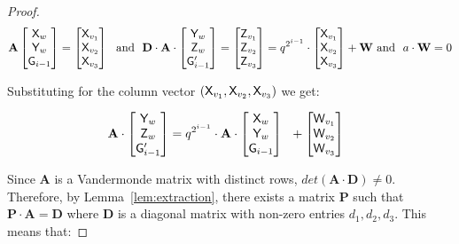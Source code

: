 \documentclass[12pt]{article}
\theoremstyle{Definition}
\begin{document}
\begin{proof}
$$\mathbf{A}
\begin{bmatrix}
\gr{X}_w \\ 
\gr{Y}_w \\ 
\gr{G}_{i-1}
\end{bmatrix} 
=  
\begin{bmatrix}
\gr{X}_{v_1} \\ 
\gr{X}_{v_2} \\ 
\gr{X}_{v_3}
\end{bmatrix}
\ \ \text{and} \ \ 
\mathbf{D} \cdot 
\mathbf{A} \cdot 
\begin{bmatrix}
\gr{Y}_w \\ 
\gr{Z}_w \\ 
\gr{G}'_{i-1}
\end{bmatrix} 
= 
\begin{bmatrix}
\gr{Z}_{v_1} \\ 
\gr{Z}_{v_2} \\ 
\gr{Z}_{v_3}
\end{bmatrix} 
= 
q^{2^{i-1}} \cdot 
\begin{bmatrix}
\gr{X}_{v_1} \\ 
\gr{X}_{v_2} \\ 
\gr{X}_{v_3}
\end{bmatrix}
+ 
\mathbf{W}  
\ \text{and} \ \ a \cdot \mathbf{W} = 0
$$

Substituting for the column vector $(\mathsf{X}_{v_1}, \mathsf{X}_{v_2}, \mathsf{X}_{v_3})$ we get: 

$$  \mathbf{A} \cdot 
\begin{bmatrix}
\mathsf{Y}_w \\ 
\mathsf{Z}_w \\ 
\mathsf{G}'_{i-1}
\end{bmatrix} 
= 
q^{2^{i-1}} \cdot \mathbf{A} \cdot  
\begin{bmatrix}
\mathsf{X}_{w} \\ 
\mathsf{Y}_{w} \\ 
\mathsf{G}_{i-1}
\end{bmatrix}  \ \
+ 
\begin{bmatrix}
\mathsf{W}_{v_1} \\ 
\mathsf{W}_{v_2} \\ 
\mathsf{W}_{v_3}
\end{bmatrix}  \ \
$$

Since $\mathbf{A}$ is a Vandermonde matrix with distinct rows, $det(\mathbf{A} \cdot \mathbf{D}) \neq 0$. Therefore, by Lemma~\ref{lem:extraction}, there exists a matrix $\mathbf{P}$ such that $\mathbf{P}\cdot \mathbf{A} = \mathbf{D}$ where $\mathbf{D}$ is a diagonal matrix with non-zero entries $d_1, d_2, d_3$. This means that: 


\end{proof}
\end{document}
